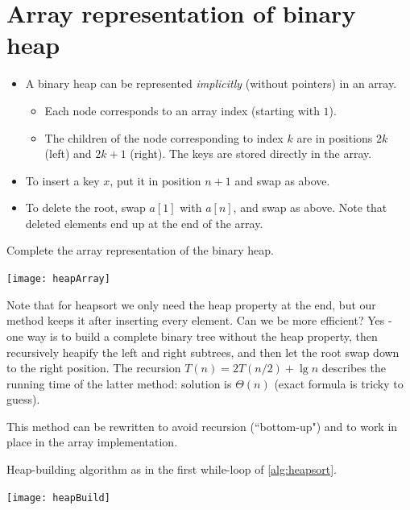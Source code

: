 \section{Array representation of binary heap}
\begin{itemize}
\item  A binary heap can be represented \emph{implicitly} (without pointers) in 
an array. 
\begin{itemize}
\item Each node corresponds to an array index (starting with $1$). 
\item The  children of the node corresponding to index $k$ are in positions $2k$ 
(left) and $2k+1$ (right). The keys are stored directly in the array.
\end{itemize}
\item To insert a key $x$, put it in position $n+1$ and swap as above.
\item To delete the root, swap $a[1]$ with $a[n]$, and swap as above. Note that
 deleted elements end up at the end of the array.
\end{itemize}

\begin{Boxample}[0]
Complete the array representation of the binary heap.
\begin{center}
\texttt{[image: heapArray]}
\end{center}
\end{Boxample}

Note that for heapsort we only need the heap property at the end, but our method keeps it after inserting every element. 
Can we be more efficient? Yes - one way is to build a complete binary tree without the heap property, then
 recursively heapify the left and right subtrees, and then let the root swap 
 down to the right position. The recursion $T(n) = 2T(n/2) + \lg n$ describes the running time of the 
 latter method: solution is $\Theta(n)$ (exact formula is tricky to guess).
 
This method can be rewritten to avoid recursion (``bottom-up") and to work 
in place in the array implementation. 

\begin{Boxample}\label{ex:heapbuild}
Heap-building algorithm as in the first while-loop of \cref{alg:heapsort}.
\begin{center}
\texttt{[image: heapBuild]}
\end{center}
\end{Boxample}

